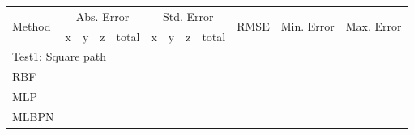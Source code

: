 \documentclass{ieeeaccess}
\begin{document}
\begin{table}[t]
	\centering
	\begin{tabular}{llllllllllll}
		\toprule
		\multirow{2}{*}{Method} & \multicolumn{4}{c}{Abs. Error}                                                                    & \multicolumn{4}{c}{Std. Error}                                                                    & \multicolumn{1}{c}{\multirow{2}{*}{RMSE}} & \multicolumn{1}{c}{\multirow{2}{*}{Min. Error}} & \multicolumn{1}{c}{\multirow{2}{*}{Max. Error}} \\ \cmidrule{2-5} \cmidrule{6-9}
		& \multicolumn{1}{c}{x} & \multicolumn{1}{c}{y} & \multicolumn{1}{c}{z} & \multicolumn{1}{c}{total} & \multicolumn{1}{c}{x} & \multicolumn{1}{c}{y} & \multicolumn{1}{c}{z} & \multicolumn{1}{c}{total} & \multicolumn{1}{c}{}                      & \multicolumn{1}{c}{}                            & \multicolumn{1}{c}{}                            \\
		\midrule
		\multicolumn{12}{l}{Test1: Square path}                                                                                                                                                                                                                                                                                                                                         \\
		\midrule
		RBF\cite{shareef2008localization}  &                       &                       &                       &                           &                       &                       &                       &                           &                                           &                                                 &                                                 \\
		MLP\cite{rahman2009localization}   &                       &                       &                       &                           &                       &                       &                       &                           &                                           &                                                 &                                                 \\
		MLBPN\cite{singh2013tdoa}          &                       &                       &                       &                           &                       &                       &                       &                           &                                           &                                                 &                                                 \\

\end{tabular}
\end{table}
\end{document}
